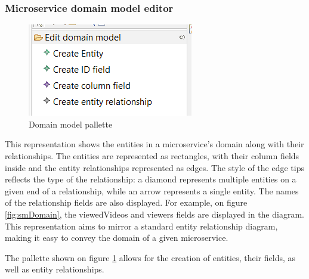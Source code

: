 \documentclass[parskip=full]{article}
\begin{document}
    \subsubsection{Microservice domain model editor}
    \begin{figure}
        \includegraphics[width=0.2\paperwidth]{domain-model-editor-pallette}
        \caption{Domain model pallette}
        \label{fig:domainEditor}
        \vspace{-5em}
    \end{figure}
    This representation shows the entities in a microservice's domain along with their relationships.
    The entities are represented as rectangles, with their column fields inside and the entity relationships represented as edges.
    The style of the edge tips reflects the type of the relationship: a diamond represents multiple entities on a given end of a relationship, while an arrow represents a single entity.
    The names of the relationship fields are also displayed.
    For example, on figure \ref{fig:smDomain}, the viewedVideos and viewers fields are displayed in the diagram.
    This representation aims to mirror a standard entity relationship diagram, making it easy to convey the domain of a given microservice.

    The pallette shown on figure \ref{fig:domainEditor} allows for the creation of entities, their fields, as well as entity relationships.
\end{document}
